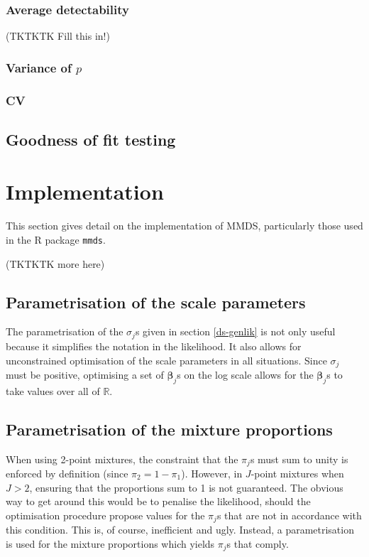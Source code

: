 \subsubsection{Average detectability}
(TKTKTK  Fill this in!)

\subsubsection{Variance of $p$}

\subsubsection{CV}

\subsection{Goodness of fit testing}





\section{Implementation}
This section gives detail on the implementation of MMDS, particularly those used in the \textsf{R} package \texttt{mmds}.

(TKTKTK more here)

\subsection{Parametrisation of the scale parameters}
The parametrisation of the $\sigma_j$s given in section \ref{ds-genlik} is not only useful because it simplifies the notation in the likelihood. It also allows for unconstrained optimisation of the scale parameters in all situations. Since $\sigma_j$ must be positive, optimising a set of $\bm{\beta}_j$s on the log scale allows for the $\bm{\beta}_j$s to take values over all of $\mathbb{R}$.


\subsection{Parametrisation of the mixture proportions}
When using 2-point mixtures, the constraint that the $\pi_j$s must sum to unity is enforced by definition (since $\pi_2=1-\pi_1$). However, in $J$-point mixtures when $J>2$, ensuring that the proportions sum to 1 is not guaranteed. The obvious way to get around this would be to penalise the likelihood, should the optimisation procedure propose values for the $\pi_j$s that are not in accordance with this condition. This is, of course, inefficient and ugly. Instead, a parametrisation is used for the mixture proportions which yields $\pi_j$s that comply.

